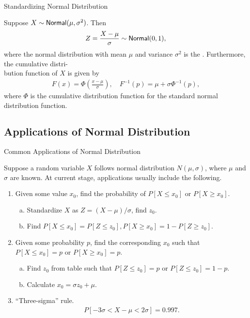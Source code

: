 \begin{frame}{Standardizing Normal Distribution}

\justifying
Suppose $X\sim \mathsf{Normal}(\mu, \sigma^2)$. Then 
\begin{align*}
Z = \frac{X-\mu}{\sigma} \sim \mathsf{Normal}(0, 1),
\end{align*}
where the normal distribution with mean $\mu$ and variance $\sigma^2$ is the . Furthermore, the cumulative distri-\\bution function of $X$ is given by
\begin{align*}
F(x) = \Phi\left(\frac{x-\mu}{\sigma} \right), \quad F^{-1}(p) = \mu + \sigma \Phi^{-1}(p),
\end{align*}
where $\Phi$ is the cumulative distribution function for the standard normal distribution function.

\end{frame}

\subsection{Applications of Normal Distribution}

\begin{frame}{Common Applications of Normal Distribution}

\justifying
Suppose a random variable $X$ follows normal distribution $N(\mu, \sigma)$, where $\mu$ and $\sigma$ are known. At current stage, applications usually include the following.
\begin{enumerate}
	\justifying
	\item Given some value $x_0$, find the probability of $P[X \leq x_0]$ or $P[X\geq x_0]$.
	\begin{enumerate}[(a).]
		\justifying
		\item Standardize $X$ as $Z = (X - \mu) / \sigma$, find $z_0$.
		\item Find $P[X \leq x_0] = P[Z\leq z_0], P[X\geq x_0] = 1 - P[Z\geq z_0]$.
	\end{enumerate}
	\item Given some probability $p$, find the corresponding $x_0$ such that $P[X\leq x_0] = p$ or $P[X\geq x_0] = p$.
	\begin{enumerate}[(a).]
		\justifying
		\item Find $z_0$ from table such that $P[Z\leq z_0] = p$ or $P[Z\leq z_0] = 1 - p$.
		\item Calculate $x_0 = \sigma z_0 + \mu$.
	\end{enumerate}
	\item ``Three-sigma'' rule.
	\begin{align*}
	P[-3\sigma < X-\mu < 2\sigma] = 0.997.
	\end{align*}
\end{enumerate}

\end{frame}


